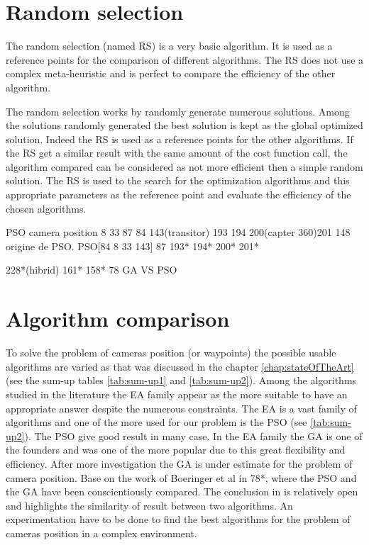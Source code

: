 \section{Random selection }

The random selection (named RS) is a very basic algorithm. It is used as a reference points for the comparison of different algorithms. The RS does not use a complex meta-heuristic and is perfect to compare the efficiency of the other algorithm.

The random selection works by randomly generate numerous solutions. Among the solutions randomly generated the best solution is kept as the global optimized solution.
Indeed the RS is used as a reference points for the other algorithms. If the RS get a similar result with the same amount of the cost function call, the algorithm compared can be considered as not more efficient then a simple random solution. 
The RS is used to the search for the optimization algorithms and this appropriate parameters as the reference point and evaluate the efficiency of the chosen algorithms.


  

PSO camera position 
8 33 87 84 143(transitor) 193 194 200(capter 360)201
148 origine de PSO. 
PSO[84 8 33 143] 87 193* 194* 200* 201* 

228*(hibrid) 161* 158* 78 GA VS PSO

\section{Algorithm comparison }\label{sec:GAvsPSO} 
%
To solve the problem of cameras position (or waypoints) the possible usable algorithms are varied as that was discussed in the chapter \ref{chap:stateOfTheArt} (see the sum-up tables \ref{tab:sum-up1} and \ref{tab:sum-up2}).
Among the algorithms studied in the literature the EA family appear as the more suitable to have an appropriate answer despite the numerous constraints. The EA is a vast family of algorithms and one of the more used for our problem is the PSO (see \ref{tab:sum-up2}). The PSO give good result in many case. In the EA family the GA is one of the founders and was one of the more popular due to this great flexibility and efficiency.
 After more investigation the GA is under estimate for the problem of camera position.
 Base on the work of Boeringer et al in \citep{78*boeringer2004}78*, where the PSO and the GA have been conscientiously compared. The conclusion in \citep{78*boeringer2004} is relatively open and highlights the similarity of result between two algorithms. An experimentation have to be done to find the best algorithms for the problem of cameras position in a complex environment. 



